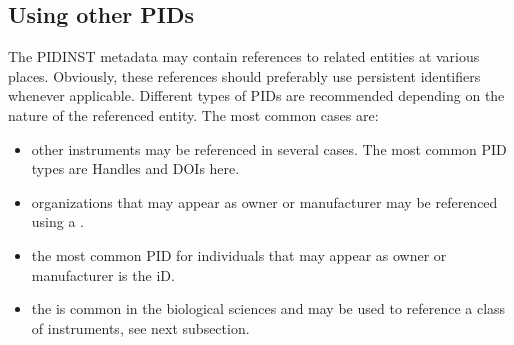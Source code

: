 \documentclass[a4paper,10pt,english]{sphinxmanual}
\begin{document}
\subsection{Using other PIDs}
\label{\detokenize{white-paper/metadata-schema-recommendations:using-other-pids}}
The PIDINST metadata may contain references to related entities at
various places.  Obviously, these references should preferably use
persistent identifiers whenever applicable.  Different types of PIDs
are recommended depending on the nature of the referenced entity.  The
most common cases are:
\begin{itemize}
\item {} 
other instruments may be referenced in several cases.  The most
common PID types are Handles and DOIs here.

\item {} 
organizations that may appear as owner or manufacturer may be
referenced using a .

\item {} 
the most common PID for individuals that may appear as owner or
manufacturer is the  iD.

\item {} 
the  is common in the biological sciences and may be used to
reference a class of instruments, see next subsection.

\end{itemize}
\end{document}
